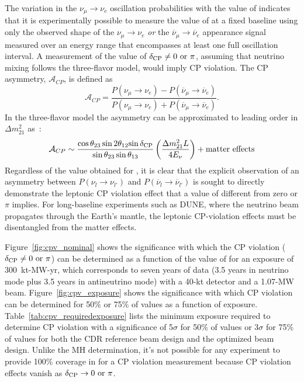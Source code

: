The variation in the $\nu_\mu \rightarrow
\nu_e$ oscillation probabilities with the value of \deltacp
indicates that it is experimentally possible to measure the value of
\deltacp at a fixed baseline using only the observed shape of the
$\nu_\mu \rightarrow \nu_e$ {\em or} the 
$\overline{\nu}_\mu \rightarrow \overline{\nu}_e$
appearance signal measured over an energy range that encompasses at
least one full oscillation interval. A measurement of the value of
$\mdeltacp \neq 0 \ {\rm or} \ \pi$, assuming that neutrino mixing follows the three-flavor model, would imply CP violation.  
The CP asymmetry,
$\mathcal{A}_{CP}$, is defined as 
\begin{equation}
\label{eqn:cp-asymm}
 \mathcal{A}_{CP} = \frac{P(\nu_\mu \rightarrow \nu_e) -
  P(\overline{\nu}_\mu \rightarrow \overline{\nu}_e)}{P(\nu_\mu \rightarrow
  \nu_e) + P(\overline{\nu}_\mu \rightarrow \overline{\nu}_e)}.
\end{equation}
In the three-flavor model the asymmetry can be approximated to leading
order in $\Delta m_{21}^2$ as~\cite{Marciano:2006uc}:
\begin{equation}
\mathcal{A}_{CP} \sim \frac{\cos \theta_{23} \sin 2 \theta_{12}
  {\sin \mdeltacp}}{\sin \theta_{23} \sin \theta_{13}}
\left(\frac{\Delta m^2_{21} L}{ 4 E_{\nu}}\right) + {\rm matter
  \ effects}
\label{eqn:cpasym}
\end{equation}
Regardless of the 
value obtained for \deltacp, it is clear that the explicit observation
of an asymmetry between $P(\nu_l \rightarrow \nu_{l'})$ and
$P(\overline{\nu}_l \rightarrow \overline{\nu}_{l'})$ 
is sought to directly demonstrate the
leptonic CP violation effect that a value of \deltacp different 
from zero or $\pi$ implies.
For long-baseline experiments such as DUNE, where the neutrino beam propagates through 
the Earth's mantle, the leptonic CP-violation effects must be disentangled from 
the matter effects.

Figure~\ref{fig:cpv_nominal} shows the significance with which the CP violation ($\mdeltacp \neq 0 \ {\rm or} \ \pi$) can be determined as a function of the value of \deltacp for an exposure of 300~kt-MW-yr, which corresponds to seven years of data (3.5 years in neutrino mode plus 3.5 years in antineutrino mode) with a 40-kt detector and a 1.07-MW beam.  Figure~\ref{fig:cpv_exposure} shows the significance with which CP violation can be determined for 50\% or 75\% of \deltacp values as a function of exposure.  Table~\ref{tab:cpv_requiredexposure} lists the minimum exposure required to determine CP violation with a significance of 5$\sigma$ for 50\% of \deltacp values or 3$\sigma$ for 75\% of \deltacp values for both the CDR reference beam design and the optimized beam design.  Unlike the MH determination, it's not possible for any experiment to provide 100\% coverage in \deltacp for a CP violation measurement because CP violation effects vanish as $\mdeltacp \rightarrow 0 {\rm~or~} \pi$.

